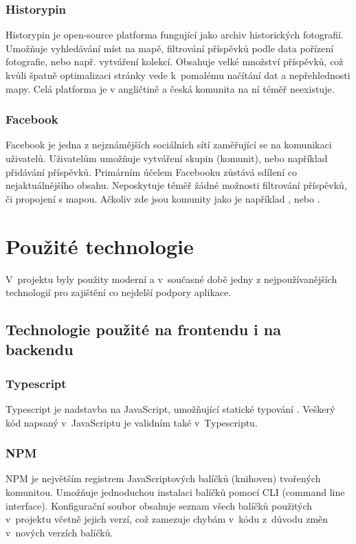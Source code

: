 \documentclass[12pt, a4paper,
  oneside,      %
]{report}
\begin{document}
\subsection{Historypin}
Historypin je open-source platforma fungující jako archiv historických fotografií. Umožňuje vyhledávání míst na mapě, filtrování příspěvků podle data pořízení fotografie, nebo např. vytváření kolekcí. Obsahuje velké množství příspěvků, což kvůli špatně optimalizaci stránky vede k~pomalému načítání dat a nepřehlednosti mapy. Celá platforma je v angličtině a česká komunita na ní téměř neexistuje.

\subsection{Facebook}
Facebook je jedna z nejznámějších sociálních sítí zaměřující se na komunikaci uživatelů. Uživatelům umožňuje vytváření skupin (komunit), nebo například přidávání příspěvků. Primárním účelem Facebooku zůstává sdílení co nejaktuálnějšího obsahu. Neposkytuje téměř žádné možnosti filtrování příspěvků, či propojení s mapou. Ačkoliv zde jsou komunity  jako je například , nebo .

\chapter{Použité technologie}
V~projektu byly použity moderní a v~současné době jedny z nejpoužívanějších technologií pro zajištění co nejdelší podpory aplikace.
\section{Technologie použité na frontendu i na backendu}
    \subsection{Typescript}
    Typescript je nadstavba na JavaScript, umožňující statické typování \cite{DynamicVsStaticTyping}. Veškerý kód napsaný v~JavaScriptu je validním také v~Typescriptu. \cite{whatIsTypescript}\cite{typescriptForTheNewProgrammer}

    \subsection{NPM}
    NPM je největším registrem JavaScriptových balíčků (knihoven) tvořených komunitou. Umožňuje jednoduchou instalaci balíčků pomocí CLI (command line interface). Konfigurační soubor obsahuje seznam všech balíčků použitých v~projektu včetně jejich verzí, což zamezuje chybám v~kódu z~důvodu změn v~nových verzích balíčků. \cite{whatIsNpmW3}\cite{aboutNpm}
\end{document}
